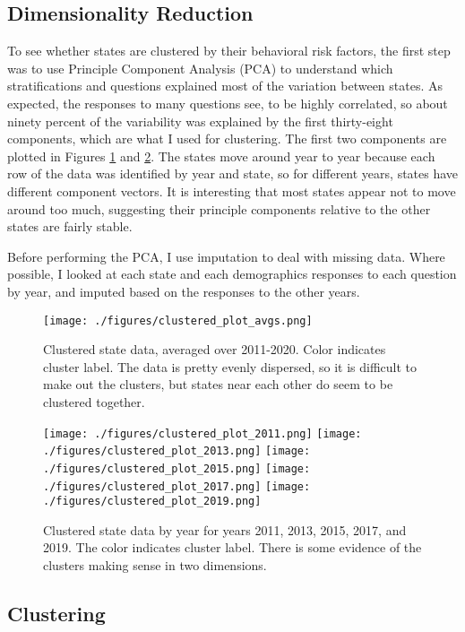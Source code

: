 \documentclass[11pt]{article}
\begin{document}
\subsection{Dimensionality Reduction}
To see whether states are clustered by their behavioral risk factors, the first step was to use Principle Component Analysis (PCA) to understand which stratifications and questions explained most of the variation between states. As expected, the responses to many questions see, to be highly correlated, so about ninety percent of the variability was explained by the first thirty-eight components, which are what I used for clustering. The first two components are plotted in Figures \ref{fig:clustered_avgs} and \ref{fig:clustered_data}. The states move around year to year because each row of the data was identified by year and state, so for different years, states have different component vectors. It is interesting that most states appear not to move around too much, suggesting their principle components relative to the other states are fairly stable.

Before performing the PCA, I use imputation to deal with missing data. Where possible, I looked at each state and each demographics responses to each question by year, and imputed based on the responses to the other years.


\begin{figure}[htbp]
\centering
\texttt{[image: ./figures/clustered\_plot\_avgs.png]}
\caption{
  Clustered state data, averaged over 2011-2020. Color indicates cluster label. The data is pretty evenly dispersed, so it is difficult to make out the clusters, but states near each other do seem to be clustered together.
}
\label{fig:clustered_avgs}
\end{figure}

\begin{figure}[hp]
\texttt{[image: ./figures/clustered\_plot\_2011.png]}
\texttt{[image: ./figures/clustered\_plot\_2013.png]}
\texttt{[image: ./figures/clustered\_plot\_2015.png]}
\texttt{[image: ./figures/clustered\_plot\_2017.png]}
\texttt{[image: ./figures/clustered\_plot\_2019.png]}
\caption{
  Clustered state data by year for years 2011, 2013, 2015, 2017, and 2019. The color indicates cluster label. There is some evidence of the clusters making sense in two dimensions.
}
\label{fig:clustered_data}
\end{figure}


\subsection{Clustering}
\end{document}
